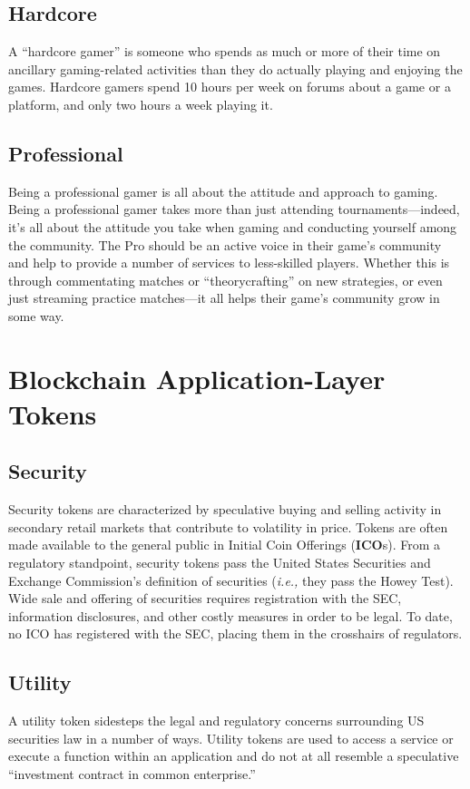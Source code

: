 \documentclass[11pt]{report}
\begin{document}
\subsection{Hardcore}\label{hardcore-gamer}
A ``hardcore gamer'' is someone who spends as much or more of their time on ancillary gaming-related activities than they do actually playing and enjoying the games. Hardcore gamers spend 10 hours per week on forums about a game or a platform, and only two hours a week playing it. \cite{hardcore-gamer}
\subsection{Professional}\label{professional-gamer}
Being a professional gamer is all about the attitude and approach to gaming. Being a professional gamer takes more than just attending tournaments---indeed, it’s all about the attitude you take when gaming and conducting yourself among the community. The Pro should be an active voice in their game’s community and help to provide a number of services to less-skilled players. Whether this is through commentating matches or ``theorycrafting'' on new strategies, or even just streaming practice matches---it all helps their game’s community grow in some way.\cite{professional-gamer}
\section{Blockchain Application-Layer Tokens}\label{blockchain-application-layer-tokens}
\subsection{Security}\label{security-token}
Security tokens are characterized by speculative buying and selling activity in secondary retail markets that contribute to volatility in price. Tokens are often made available to the general public in Initial Coin Offerings (\textbf{ICO}s).\cite{what-is-an-ico} From a regulatory standpoint, security tokens pass the United States Securities and Exchange Commission's definition of securities (\textit{i.e.,} they pass the Howey Test\cite{howey-test}). Wide sale and offering of securities requires registration with the SEC, information disclosures, and other costly measures in order to be legal. To date, no ICO has registered with the SEC, placing them in the crosshairs of regulators.\cite{jay-clayton-testimony}
\subsection{Utility}\label{utility-token}
A utility token sidesteps the legal and regulatory concerns surrounding US securities law in a number of ways. Utility tokens are used to access a service or execute a function within an application and do not at all resemble a speculative ``investment contract in common enterprise.''\cite{defining-common-enterprise} \cite{investment-contract}
\end{document}

